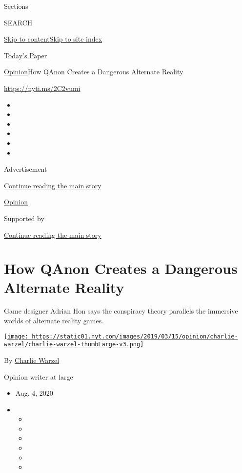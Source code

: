 Sections

SEARCH

\protect\hyperlink{site-content}{Skip to
content}\protect\hyperlink{site-index}{Skip to site index}

\href{https://myaccount.nytimes.com/auth/login?response_type=cookie\&client_id=vi}{}

\href{https://www.nytimes.com/section/todayspaper}{Today's Paper}

\href{/section/opinion}{Opinion}\textbar{}How QAnon Creates a Dangerous
Alternate Reality

\url{https://nyti.ms/2C2vumi}

\begin{itemize}
\item
\item
\item
\item
\item
\item
\end{itemize}

Advertisement

\protect\hyperlink{after-top}{Continue reading the main story}

\href{/section/opinion}{Opinion}

Supported by

\protect\hyperlink{after-sponsor}{Continue reading the main story}

\hypertarget{how-qanon-creates-a-dangerous-alternate-reality}{%
\section{How QAnon Creates a Dangerous Alternate
Reality}\label{how-qanon-creates-a-dangerous-alternate-reality}}

Game designer Adrian Hon says the conspiracy theory parallels the
immersive worlds of alternate reality games.

\href{https://www.nytimes.com/by/charlie-warzel}{\texttt{[image: https://static01.nyt.com/images/2019/03/15/opinion/charlie-warzel/charlie-warzel-thumbLarge-v3.png]}}

By \href{https://www.nytimes.com/by/charlie-warzel}{Charlie Warzel}

Opinion writer at large

\begin{itemize}
\item
  Aug. 4, 2020
\item
  \begin{itemize}
  \item
  \item
  \item
  \item
  \item
  \item
  \end{itemize}
\end{itemize}

